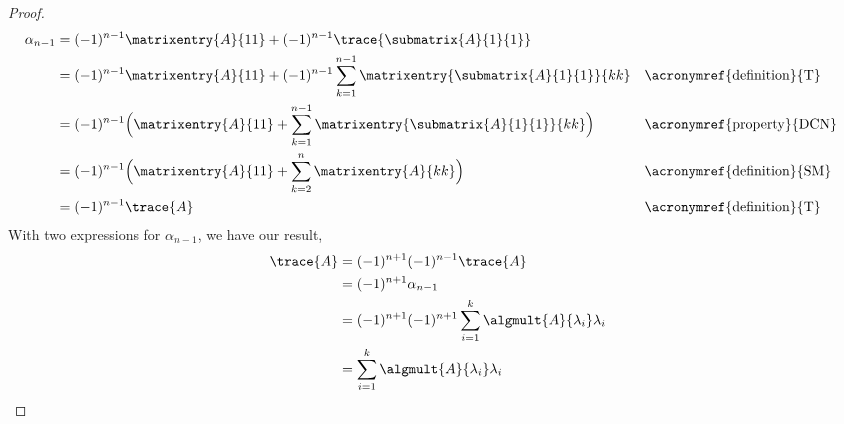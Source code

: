 \begin{proof}
%
\begin{align*}
\alpha_{n-1}
&=(-1)^{n-1}\matrixentry{A}{11}
+(-1)^{n-1}\trace{\submatrix{A}{1}{1}}\\
&=(-1)^{n-1}\matrixentry{A}{11}
+(-1)^{n-1}\sum_{k=1}^{n-1} \matrixentry{\submatrix{A}{1}{1}}{kk}&&\text{\acronymref{definition}{T}}\\
&=(-1)^{n-1}\Big(\matrixentry{A}{11}+\sum_{k=1}^{n-1} \matrixentry{\submatrix{A}{1}{1}}{kk}\Big)&&\text{\acronymref{property}{DCN}}\\
&=(-1)^{n-1}\Big(\matrixentry{A}{11}+\sum_{k=2}^{n} \matrixentry{A}{kk}\Big)&&\text{\acronymref{definition}{SM}}\\
&=(-1)^{n-1}\trace{A}&&\text{\acronymref{definition}{T}}
\end{align*}
%
With two expressions for $\alpha_{n-1}$, we have our result,
%
\begin{align*}
\trace{A}
&=(-1)^{n+1}(-1)^{n-1}\trace{A}\\
&=(-1)^{n+1}\alpha_{n-1}\\
&=(-1)^{n+1}(-1)^{n+1}\sum_{i=1}^{k}\algmult{A}{\lambda_i}\lambda_i\\
&=\sum_{i=1}^{k}\algmult{A}{\lambda_i}\lambda_i
\end{align*}
%
\end{proof}
%

